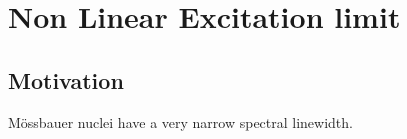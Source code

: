 \chapter{Non Linear Excitation limit}
\section{Motivation}
M\"ossbauer nuclei have a very narrow spectral linewidth. 